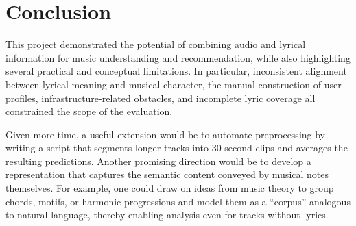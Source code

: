 \section{Conclusion}

This project demonstrated the potential of combining audio and lyrical information for music understanding and recommendation, while also highlighting several practical and conceptual limitations. In particular, inconsistent alignment between lyrical meaning and musical character, the manual construction of user profiles, infrastructure-related obstacles, and incomplete lyric coverage all constrained the scope of the evaluation.

Given more time, a useful extension would be to automate preprocessing by writing a script that segments longer tracks into 30-second clips and averages the resulting predictions. Another promising direction would be to develop a representation that captures the semantic content conveyed by musical notes themselves. For example, one could draw on ideas from music theory to group chords, motifs, or harmonic progressions and model them as a “corpus” analogous to natural language, thereby enabling analysis even for tracks without lyrics.